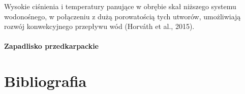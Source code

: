 \documentclass[11.5pt,twoside]{report}
\begin{document}
 Wysokie ciśnienia i temperatury panujące w obrębie skał niższego systemu wodonośnego, w połączeniu z dużą porowatością tych utworów, umożliwiają rozwój konwekcyjnego przepływu wód (Horv\'{a}th et al., 2015). 
 
 \subsubsection{Zapadlisko przedkarpackie}
 
 
 
 
 
 

%

\chapter*{Bibliografia}

\end{document}

